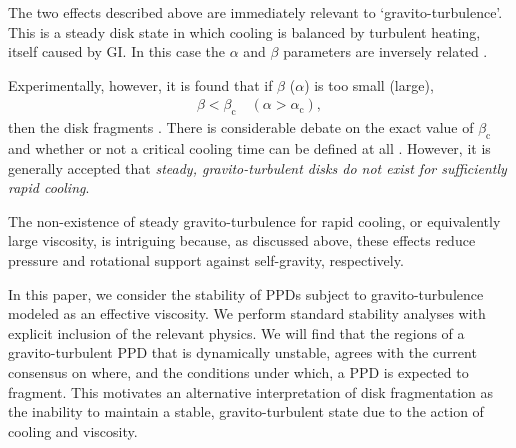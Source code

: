 \documentclass[iop, numberedappendix]{emulateapj}
\begin{document}


The two effects described above are immediately relevant to
`gravito-turbulence'. This is a steady disk state in which cooling is
balanced by turbulent heating, itself caused by GI. In this case 
the $\alpha$ and $\beta$ parameters are inversely related
\citep{gammie01}.   

Experimentally, however, it is found that if $\beta$ ($\alpha$) is
too small (large), 
\begin{align}
  \beta < \beta_\mathrm{c} \quad
  \left(\alpha>\alpha_\mathrm{c}\right), 
\end{align}
then the disk fragments \citep{gammie01,rice05,rice11}. 
There is considerable debate on the exact value of $\beta_\mathrm{c}$
and whether or not a critical cooling time can 
be defined at all \citep{meru11,meru12,paardekooper12,hopkins13}. However, it is
generally accepted that \emph{steady, gravito-turbulent disks do not
  exist for sufficiently rapid cooling}. 


The non-existence of steady gravito-turbulence for rapid cooling, or
equivalently large viscosity, is intriguing because, as discussed
above, these effects reduce pressure and rotational support 
against self-gravity, respectively. 

In this paper, we consider the stability of PPDs subject to 
gravito-turbulence modeled as an effective viscosity. 
We perform standard stability analyses with explicit inclusion of the
relevant physics. 
We will find that the
regions of a gravito-turbulent PPD that is dynamically unstable,
agrees with the current consensus on where, and the conditions under
which, a PPD is expected to fragment. This motivates an alternative 
interpretation of disk fragmentation as the inability to maintain a
stable, gravito-turbulent state due to the action of cooling and
viscosity.  




\end{document}
